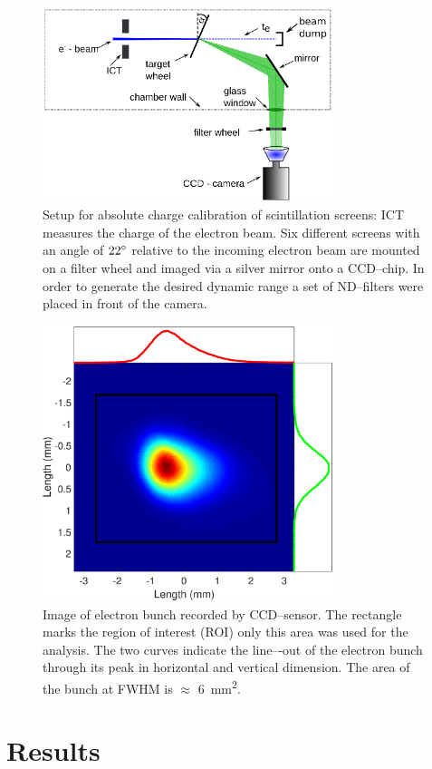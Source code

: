 \documentclass[%
preprint,
amsmath,
amssymb,
aip,
rsi, 
numerical,
floatfix,
]{revtex4-1}
\begin{document}
\begin{figure}
\includegraphics[width=8.5cm]{./Figures/Setup_V2}%
\caption{\label{fig:Setup}Setup for absolute charge calibration of scintillation screens: ICT measures the charge of the electron beam. 
Six different screens with an angle of $22\degree$ relative to the incoming electron beam are mounted on a filter wheel and imaged via a silver mirror onto a CCD--chip.
In order to generate the desired dynamic range a set of ND--filters were placed in front of the camera.}
\end{figure}
\begin{figure}
\includegraphics[width=8.5cm]{./Figures/electron_bunch}%
\caption{\label{fig:electron_bunch}
Image of electron bunch recorded by CCD–sensor. 
The rectangle marks the region of interest (ROI) only this area was used for the analysis. 
The two curves indicate the line–-out of the electron bunch through its peak in
horizontal and vertical dimension. 
The area of the bunch at FWHM is $\approx$ \SI{6}{\square\milli\meter}.}
\end{figure}

\section{\label{Res} Results}
\end{document}
